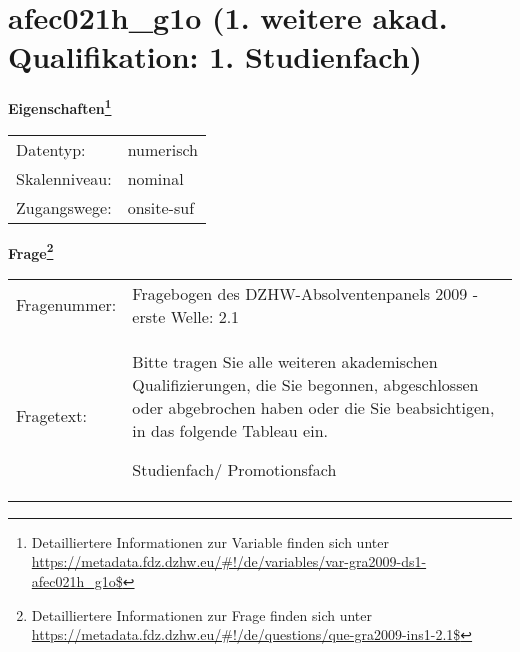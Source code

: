 
    \setcounter{footnote}{0}

    \vspace*{-1.8cm}
	\section{afec021h\_g1o (1. weitere akad. Qualifikation: 1. Studienfach)}
	\label{section:afec021h_g1o}



    \vspace*{0.5cm}
    \noindent\textbf{Eigenschaften\footnote{Detailliertere Informationen zur Variable finden sich unter
		\url{https://metadata.fdz.dzhw.eu/\#!/de/variables/var-gra2009-ds1-afec021h_g1o$}}}\\
	\begin{tabularx}{\hsize}{@{}lX}
	Datentyp: & numerisch \\
	Skalenniveau: & nominal \\
	Zugangswege: &
	  onsite-suf
 \\
    \end{tabularx}



				\vspace*{0.5cm}
                \noindent\textbf{Frage\footnote{Detailliertere Informationen zur Frage finden sich unter
		              \url{https://metadata.fdz.dzhw.eu/\#!/de/questions/que-gra2009-ins1-2.1$}}}\\
				\begin{tabularx}{\hsize}{@{}lX}
					Fragenummer: &
					  Fragebogen des DZHW-Absolventenpanels 2009 - erste Welle:
					  2.1
 \\
					Fragetext: & Bitte tragen Sie alle weiteren akademischen Qualifizierungen, die Sie begonnen, abgeschlossen oder abgebrochen haben oder die Sie beabsichtigen, in das folgende Tableau ein.\par  Studienfach/ Promotionsfach \\
				\end{tabularx}





